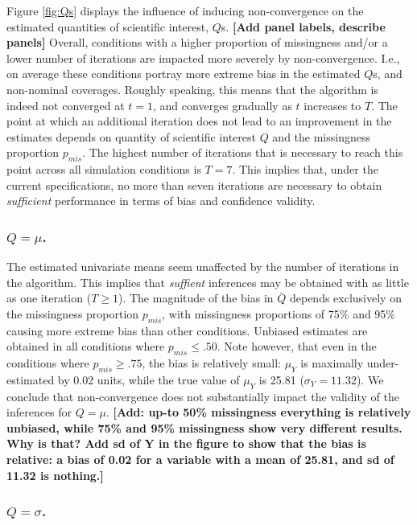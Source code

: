 \documentclass[Royal,times,sageh]{sagej}
\begin{document}
Figure \ref{fig:Qs} displays the influence of inducing non-convergence on the estimated quantities of scientific interest, \(Q\)s. \textbf{{[}Add panel labels, describe panels{]}} Overall, conditions with a higher proportion of missingness and/or a lower number of iterations are impacted more severely by non-convergence. I.e., on average these conditions portray more extreme bias in the estimated \(Q\)s, and non-nominal coverages. Roughly speaking, this means that the algorithm is indeed not converged at \(t=1\), and converges gradually as \(t\) increases to \(T\). The point at which an additional iteration does not lead to an improvement in the estimates depends on quantity of scientific interest \(Q\) and the missingness proportion \(p_{mis}\). The highest number of iterations that is necessary to reach this point across all simulation conditions is \(T=7\). This implies that, under the current specifications, no more than seven iterations are necessary to obtain \emph{sufficient} performance in terms of bias and confidence validity.

\hypertarget{qmu.}{%
\subsubsection{\texorpdfstring{\(Q=\mu\).}{Q=\textbackslash mu.}}\label{qmu.}}

The estimated univariate means seem unaffected by the number of iterations in the algorithm. This implies that \emph{suffient} inferences may be obtained with as little as one iteration (\(T \geq 1\)). The magnitude of the bias in \(\bar{Q}\) depends exclusively on the missingness proportion \(p_{mis}\), with missingness proportions of 75\% and 95\% causing more extreme bias than other conditions. Unbiased estimates are obtained in all conditions where \(p_{mis}\leq.50\). Note however, that even in the conditions where \(p_{mis}\geq.75\), the bias is relatively small: \(\mu_Y\) is maximally under-estimated by 0.02 units, while the true value of \(\mu_Y\) is 25.81 (\(\sigma_Y = 11.32\)). We conclude that non-convergence does not substantially impact the validity of the inferences for \(Q=\mu\). \textbf{{[}Add: up-to 50\% missingness everything is relatively unbiased, while 75\% and 95\% missingness show very different results. Why is that? Add sd of Y in the figure to show that the bias is relative: a bias of 0.02 for a variable with a mean of 25.81, and sd of 11.32 is nothing.{]}}

\hypertarget{qsigma.}{%
\subsubsection{\texorpdfstring{\(Q=\sigma\).}{Q=\textbackslash sigma.}}\label{qsigma.}}
\end{document}
